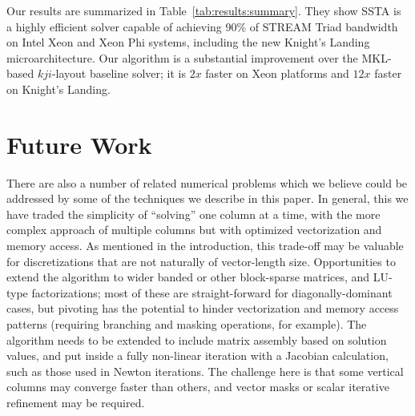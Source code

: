 \documentclass[10pt, conference, compsocconf]{IEEEtran}
\newcommand{\textapprox}{\texttildelow}
\begin{document}
Our results are summarized in Table~\ref{tab:results:summary}.
They show SSTA is a highly efficient solver capable of achieving 90\%
  of STREAM Triad bandwidth on Intel Xeon and Xeon Phi systems, including the new
  Knight's Landing microarchitecture.
Our algorithm is a substantial improvement over the MKL-based \(kji\)-layout
  baseline solver; it is \textapprox \(2x\) faster on Xeon platforms and
  \textapprox \(12x\) faster on Knight's Landing.

\section{Future Work}
\label{sec:future}
There are also a number of related numerical problems which we believe could be
  addressed by some of the techniques we describe in this paper.
In general, this we have traded the simplicity of ``solving'' one column
  at a time, with the more complex approach of multiple columns 
  but with optimized vectorization and memory access.
As mentioned in the introduction, this trade-off may be valuable for
  discretizations that are not naturally of vector-length size.
Opportunities to extend the algorithm to wider banded or other 
  block-sparse matrices, and LU-type factorizations;
  most of these are straight-forward for diagonally-dominant cases, but
  pivoting has the potential to hinder vectorization and memory 
  access patterns (requiring branching and masking operations, for example).
The algorithm needs to be extended to include matrix assembly
  based on solution values, and put inside a fully non-linear iteration
  with a Jacobian calculation, such as those used in Newton iterations.
The challenge here is that some vertical columns may converge faster than
  others, and vector masks or scalar iterative refinement may be required.

\end{document}
